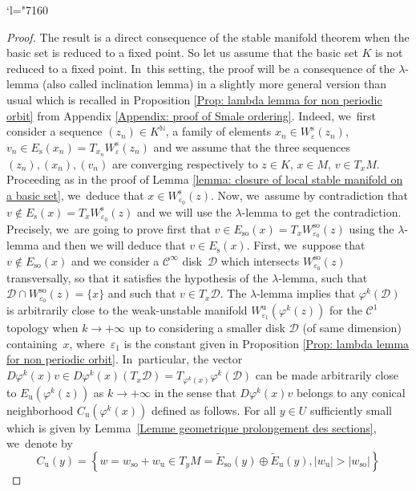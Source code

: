 \documentclass[11pt]{article}
\newcommand{\Changel}{\mathcode`l="7160}
\newcommand{\rs}{\mathrm{s}}
\newcommand{\rso}{\mathrm{so}}
\newcommand{\ru}{\mathrm{u}}
\theoremstyle{definition}
\theoremstyle{plain}
\newcommand{\Ccal}{\mathcal{C}}
\newcommand{\D}{\mathcal{D}}
\newcommand{\N}{\mathbb{N}}
\begin{document}
\Changel
\begin{proof}
The result is a direct consequence of the stable manifold theorem when the basic set is reduced to a fixed point. So let us assume that the basic set $K$ is not reduced to a fixed point. In~this setting, the proof will be a consequence of the $\lambda$-lemma (also called inclination lemma) in a slightly more general version than usual which is recalled in Proposition \ref{Prop: lambda lemma for non periodic orbit} from Appendix \ref{Appendix: proof of Smale ordering}. Indeed, we~first consider a sequence $(z_n) \in K^{\N}$, a family of elements $x_n \in W_{\varepsilon}^\rs (z_n)$, $v_n \in E_\rs (x_n) = T_{x_n} W_{\varepsilon}^\rs (z_n)$ and we assume that the three sequences $(z_n),(x_n),(v_n)$ are converging respectively to $z \in K$, $x \in M$, $v \in T_x M$. Proceeding as in the proof of Lemma \ref{lemma: closure of local stable manifold on a basic set}, we~deduce that $x \in W_{\varepsilon_0}^\rs (z)$. Now, we~assume by contradiction that $v \notin E_\rs (x) = T_x W_{\varepsilon_0}^\rs (z)$ and we will use the $\lambda$-lemma to get the contradiction. Precisely, we~are going to prove first that $v \in E_{\rso} (x) = T_x W_{\varepsilon_0}^{\rso} (z)$ using the $\lambda$-lemma and then we will deduce that $v \in E_\rs (x)$. First, we~suppose that $v \notin E_{\rso}(x)$ and we consider a $\Ccal^{\infty}$ disk~$\D$ which intersects $W_{\varepsilon_0}^{\rso} (z)$ transversally, so that it satisfies the hypothesis of the $\lambda$\nobreakdash-lemma, such that \hbox{$\D \cap W_{\varepsilon_0}^{\rso} (z) = \{x\}$} and such that $v \in T_x \D$. The $\lambda$-lemma implies that $\varphi^k \left(\D \right)$ is arbitrarily close to the weak-unstable manifold $W_{\varepsilon_1}^{\ru} (\varphi^k (z))$ for the $\Ccal^1$ topology when $k \to +\infty$ up to considering a smaller disk $\D$ (of same dimension) containing~$x$, where~$\varepsilon_1$ is the constant given in Proposition \ref{Prop: lambda lemma for non periodic orbit}. In~particular, the vector $D \varphi^k (x)v \in D \varphi^k (x) \left(T_x \D \right) = T_{\varphi^k (x)} \varphi^k \left(\D \right)$ can be made arbitrarily close to $E_{\ru} (\varphi^k (z))$ as $k \to + \infty$ in the sense that $D \varphi^k (x)v$ belongs to any conical neighborhood $C_{\ru} (\varphi^k (x))$ defined as follows. For all $y \in U$ sufficiently small which is given by Lemma~\ref{Lemme geometrique prolongement des sections}, we~denote by
\[
C_{\ru} (y) = \left\{w = w_{\rso} + w_{\ru} \in T_y M =\widetilde{E}_{\rso} (y) \oplus \widetilde{E}_{\ru} (y), |w_{\ru}| > |w_{\rso}| \right\}
\]
\end{proof}
\end{document}
